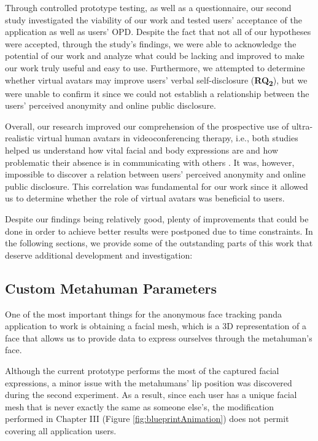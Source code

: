 Through controlled prototype testing, as well as a questionnaire, our second study investigated the viability of our work and tested users' acceptance of the application as well as users' OPD. Despite the fact that not all of our hypotheses were accepted, through the study's findings, we were able to acknowledge the potential of our work and analyze what could be lacking and improved to make our work truly useful and easy to use. Furthermore, we attempted to determine whether virtual avatars may improve users' verbal self-disclosure (\textbf{RQ\textsubscript{2}}), but we were unable to confirm it since we could not establish a relationship between the users' perceived anonymity and online public disclosure.

Overall, our research improved our comprehension of the prospective use of ultra-realistic virtual human avatars in videoconferencing therapy, i.e., both studies helped us understand how vital facial and body expressions are and how problematic their absence is in communicating with others \cite{KNA13}. It was, however, impossible to discover a relation between users' perceived anonymity and online public disclosure. This correlation was fundamental for our work since it allowed us to determine whether the role of virtual avatars was beneficial to users.

Despite our findings being relatively good, plenty of improvements that could be done in order to achieve better results were postponed due to time constraints. In the following sections, we provide some of the outstanding parts of this work that deserve additional development and investigation:

\subsection{Custom Metahuman Parameters}
One of the most important things for the anonymous face tracking panda application to work is obtaining a facial mesh, which is a 3D representation of a face that allows us to provide data to express ourselves through the metahuman's face. 

Although the current prototype performs the most of the captured facial expressions, a minor issue with the metahumans' lip position was discovered during the second experiment. As a result, since each user has a unique facial mesh that is never exactly the same as someone else's, the modification performed in Chapter III (Figure \ref{fig:blueprintAnimation}) does not permit covering all application users. 

